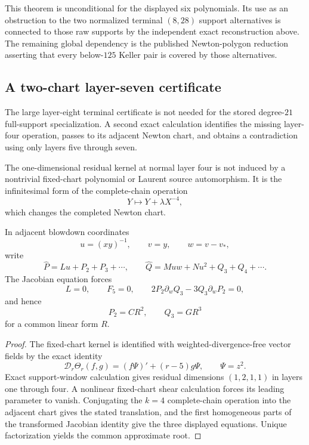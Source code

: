 This theorem is unconditional for the displayed six polynomials.  Its use
as an obstruction to the two normalized terminal \((8,28)\) support
alternatives is connected to those raw supports by the independent exact
reconstruction above.  The remaining global dependency is the published
Newton-polygon reduction asserting that every below-\(125\) Keller pair is
covered by those alternatives.

\subsection{A two-chart layer-seven certificate}
\label{subsec:two-chart-layer-seven}

The large layer-eight terminal certificate is not needed for the stored
degree-\(21\) full-support specialization.  A second exact calculation
identifies the missing layer-four operation, passes to its adjacent Newton
chart, and obtains a contradiction using only layers five through seven.

\begin{proposition}
\label{prop:k4-chart-transition}
The one-dimensional residual kernel at normal layer four is not induced by
a nontrivial fixed-chart polynomial or Laurent source automorphism.
It is the infinitesimal form of the complete-chain operation
\[
Y\longmapsto Y+\lambda X^{-4},
\]
which changes the completed Newton chart.

In adjacent blowdown coordinates
\[
u=(xy)^{-1},\qquad v=y,\qquad w=v-v_*,
\]
write
\[
\widehat P=Lu+P_2+P_3+\cdots,\qquad
\widehat Q=Muw+Nu^2+Q_3+Q_4+\cdots.
\]
The Jacobian equation forces
\[
L=0,\qquad F_5=0,\qquad
2P_2\partial_wQ_3-3Q_3\partial_wP_2=0,
\]
and hence
\[
P_2=CR^2,\qquad Q_3=GR^3
\]
for a common linear form \(R\).
\end{proposition}

\begin{proof}
The fixed-chart kernel is identified with weighted-divergence-free vector
fields by the exact identity
\[
\mathscr D_r\Theta_r(f,g)=(f\Psi)'+(r-5)g\Psi,
\qquad \Psi=z^2.
\]
Exact support-window calculation gives residual dimensions
\((1,2,1,1)\) in layers one through four.  A nonlinear fixed-chart shear
calculation forces its leading parameter to vanish.  Conjugating the
\(k=4\) complete-chain operation into the adjacent chart gives the stated
translation, and the first homogeneous parts of the transformed Jacobian
identity give the three displayed equations.  Unique factorization yields
the common approximate root.
\end{proof}

